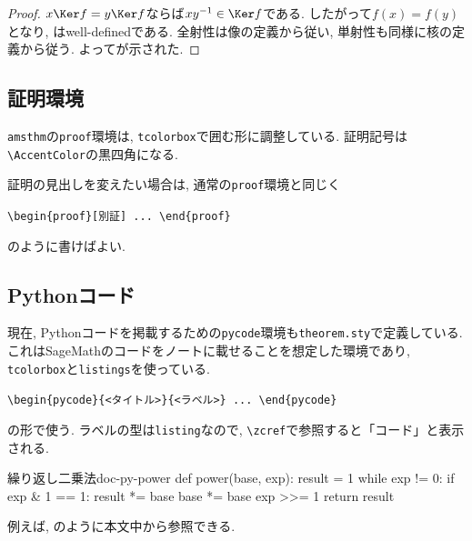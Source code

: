 \documentclass[../main.tex]{subfiles}
\begin{document}
\begin{proof}
	$x\Ker f=y\Ker f$ならば$xy^{-1}\in\Ker f$である. 
	したがって$f(x)=f(y)$となり, はwell-definedである. 
	全射性は像の定義から従い, 単射性も同様に核の定義から従う. 
	よってが示された. 
\end{proof}

\subsection{証明環境}

\texttt{amsthm}の\texttt{proof}環境は, \texttt{tcolorbox}で囲む形に調整している. 
証明記号は\verb|\AccentColor|の黒四角になる. 

証明の見出しを変えたい場合は, 通常の\texttt{proof}環境と同じく
\begin{center}
	\verb|\begin{proof}[別証] ... \end{proof}|
\end{center}
のように書けばよい. 

\subsection{Pythonコード}

現在, Pythonコードを掲載するための\verb|pycode|環境も\texttt{theorem.sty}で定義している. 
これはSageMathのコードをノートに載せることを想定した環境であり, \texttt{tcolorbox}と\texttt{listings}を使っている. 

\begin{center}
	\verb|\begin{pycode}{<タイトル>}{<ラベル>} ... \end{pycode}|
\end{center}
の形で使う. 
ラベルの型は\texttt{listing}なので, \verb|\zcref|で参照すると「コード」と表示される. 

\begin{pycode}{繰り返し二乗法}{doc-py-power}
def power(base, exp):
	result = 1
	while exp != 0:
		if exp & 1 == 1:
			result *= base
		base *= base
		exp >>= 1
	return result
\end{pycode}

例えば, のように本文中から参照できる. 
\end{document}
